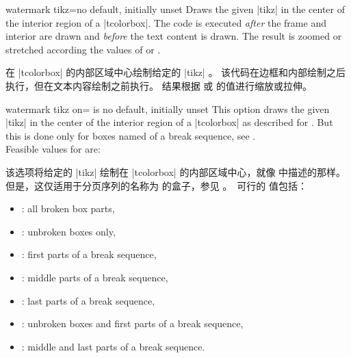 \begin{docTcbKey}{watermark tikz}{=}{no default, initially unset}
Draws the given |tikz| 
in the center of the interior region of a |tcolorbox|.
The code is executed \emph{after} the
frame and interior are drawn and \emph{before} the text content is drawn.
The result is zoomed or stretched according the values of
 or .

在 |tcolorbox| 的内部区域中心绘制给定的 |tikz| 。 该代码在边框和内部绘制之后执行，但在文本内容绘制之前执行。 结果根据  或  的值进行缩放或拉伸。
\begin{dispExample}

\begin{tcolorbox}[enhanced,title=My title,
watermark tikz={\draw[line width=2mm] circle (1cm)
node{\fontfamily{ptm}\fontseries{b}\fontsize{20mm}{20mm}\selectfont ?};}]
\lipsum[1]
\tcblower
\lipsum[2]
\end{tcolorbox}
\end{dispExample}
\end{docTcbKey}



\begin{docTcbKey}{watermark tikz on}{= is }{no default, initially unset}
This option draws the given |tikz|  in the center of the interior region of a |tcolorbox|
as described for .
But this is done only for boxes named  of a break sequence, see
.\\ 
Feasible values for  are:

该选项将给定的 |tikz|  绘制在 |tcolorbox| 的内部区域中心，就像  中描述的那样。但是，这仅适用于分页序列的名称为  的盒子，参见 。\ 可行的  值包括：
\begin{itemize}
\item{}: all broken box parts,
\item{}: unbroken boxes only,
\item{}: first parts of a break sequence,
\item{}: middle parts of a break sequence,
\item{}: last parts of a break sequence,
\item{}: unbroken boxes and first parts of a break sequence,
\item{}: middle and last parts of a break sequence.
\end{itemize}
\end{docTcbKey}


